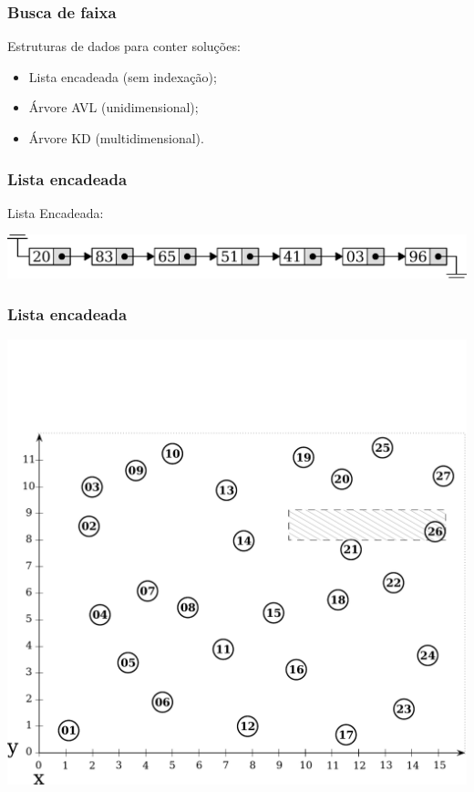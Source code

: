 \documentclass[10pt,xcolor=table,fleqn]{beamer}
\begin{document}
\begin{frame}
  \frametitle{Busca de faixa}
  Estruturas de dados para conter soluções:
  \begin{itemize}
    \item{ Lista encadeada (sem indexação)};
    \item{ Árvore AVL (unidimensional)};
    \item{ Árvore KD (multidimensional)}.
  \end{itemize}
\end{frame}

\begin{frame}
  \frametitle{Lista encadeada}
  Lista Encadeada:\\
  \begin{center}
    \includegraphics[scale=0.4]{../img/kdt/lst-model}
  \end{center}
\end{frame}

\begin{frame}
  \frametitle{Lista encadeada}
  \begin{center}
    \includegraphics[scale=0.3]{../img/points-query/lst/points}
  \end{center}
\end{frame}
\end{document}
